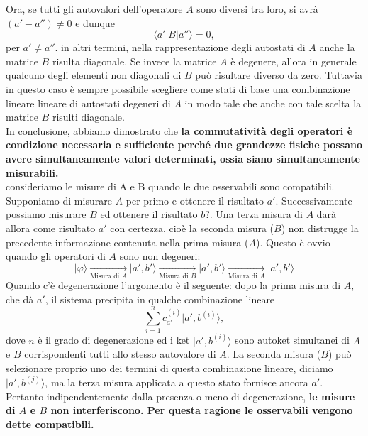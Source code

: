 Ora, se tutti gli autovalori dell'operatore $A$ sono diversi tra loro, si avrà $(a'-a'') \neq 0$ e dunque
\begin{equation}
\langle a' \vert B \vert a'' \rangle =0,
\end{equation}
per $a' \neq a''$.
in altri termini, nella rappresentazione degli autostati di $A$ anche la matrice $B$ risulta diagonale. Se invece la matrice $A$ è degenere, allora in generale qualcuno degli elementi non diagonali di $B$ può risultare diverso da zero. Tuttavia in questo caso è sempre possibile scegliere come stati di base una combinazione lineare lineare di autostati degeneri di $A$ in modo tale che anche con tale scelta la matrice $B$ risulti diagonale.\\
In conclusione, abbiamo dimostrato che \textbf{la commutatività degli operatori è condizione necessaria e sufficiente perché due grandezze fisiche possano avere simultaneamente valori determinati, ossia siano simultaneamente misurabili.}\\
consideriamo le misure di A e B quando le due osservabili sono compatibili. Supponiamo di misurare $A$ per primo e ottenere il risultato $a'$. Successivamente possiamo misurare $B$ ed ottenere il risultato $b?$. Una terza misura di $A$ darà allora come risultato $a'$ con certezza, cioè la seconda misura ($B$) non distrugge la precedente informazione contenuta nella prima misura ($A$). Questo è ovvio quando gli operatori di $A$ sono non degeneri:
\begin{equation}
\vert \varphi \rangle \xrightarrow[\textrm{Misura di }A]{ } \vert a',b' \rangle \xrightarrow[\textrm{Misura di }B]{ } \vert a',b' \rangle \xrightarrow[\textrm{Misura di }A]{ } \vert a',b' \rangle  
\end{equation}
Quando c'è degenerazione l'argomento  è il seguente: dopo la prima misura di $A$, che dà $a'$, il sistema precipita in qualche combinazione lineare
\begin{equation}
\sum _{i=1} ^n c_{a'} ^{(i)} \vert a', b^{(i)} \rangle ,
\end{equation}
dove $n$ è il grado di degenerazione ed i ket $\vert a', b^{(i)} \rangle $ sono autoket simultanei di $A$ e $B$ corrispondenti tutti allo stesso autovalore di $A$. La seconda misura ($B$) può selezionare proprio uno dei termini di questa combinazione lineare, diciamo $\vert a', b^{(j)} \rangle $, ma la terza misura applicata a questo stato fornisce ancora $a'$. Pertanto indipendentemente dalla presenza o meno di degenerazione, \textbf{le misure di $A$ e $B$ non interferiscono. Per questa ragione le osservabili vengono dette compatibili.}\\
